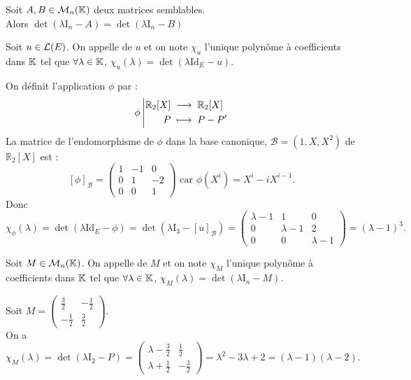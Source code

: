 \documentclass[a4paper]{book}
\begin{document}
\begin{Lemme}
Soit $A,B\in \mathcal{M}_{n}(\mathbb{K})$ deux matrices semblables.\\
Alors $\det(\lambda    \mathrm{I}_n - A) = \det(\lambda    \mathrm{I}_n - B)$
\end{Lemme}
\begin{Definition}
Soit $u\in \mathcal{L}(E)$.
On appelle  de $u$ et on note $\chi       _u$ l'unique polynôme à coefficients dans $\mathbb{K} $ tel que $\forall   \lambda    \in \mathbb{K} $, $\chi       _u(\lambda    ) = \det(\lambda    \mathrm{Id}_E - u)$.
\end{Definition}
\begin{Exemple}
On définit l'application $\phi$ par : 
$$
{\phi}\left|\begin{aligned}{\mathbb{R}_2[X]}&\;\longrightarrow\;{\mathbb{R}_2[X]}\\{P}&\;\longmapsto\;{P-P'}\end{aligned}\right.$$
La matrice de l'endomorphisme de $\phi$ dans la base canonique, $\mathcal{B} =(1,X,X^2)$ de $\mathbb{R}_2[X]$ est :
$$[\phi]_{\mathcal{B} }=\begin{pmatrix}1 &-1&0\\0 &1&-2\\0&0&1 \end{pmatrix}\text{ car } \phi(X^i)=X^i-i  X^{i-1}.$$
Donc $\chi       _\phi(\lambda    )= \det(\lambda    \mathrm{Id}_E - \phi)=\det(\lambda    \mathrm{I}_3 - [u]_\mathcal{B} )=\begin{pmatrix}\lambda    -1 &1&0\\0 &\lambda    -1&2\\0&0&\lambda    -1 \end{pmatrix}=(\lambda    -1)^3.$
\end{Exemple}
\begin{Definition}
Soit $M\in \mathcal{M}_{n}(\mathbb{K})$.
On appelle  de $M$ et on note $\chi       _M$ l'unique polynôme à coefficients dans $\mathbb{K} $ tel que $\forall   \lambda    \in \mathbb{K} $, $\chi       _M(\lambda    ) = \det(\lambda    \mathrm{I}_n - M)$.
\end{Definition}
\begin{Exemple}Soit $M=\begin{pmatrix}\frac 3 2 &-\frac 1 2\\-\frac 1 2&\frac 3 2\end{pmatrix}$.\\
On a $\chi       _M(\lambda    )= \det(\lambda    \mathrm{I}_2 - P)=\begin{pmatrix}\lambda    -\frac 3 2 &\frac 1 2\\\lambda    +\frac 1 2&-\frac 3 2\end{pmatrix}=\lambda    ^2-3\lambda    +2=(\lambda    -1)(\lambda    -2).$
\end{Exemple}
\end{document}
